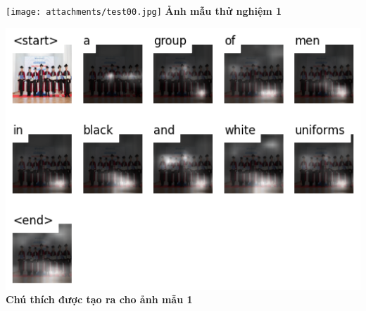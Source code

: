\documentclass[conference]{IEEEtran}
\begin{document}
\begin{center}
    \begin{minipage}[b]{0.48\textwidth}
        \centering
        \texttt{[image: attachments/test00.jpg]}
        \vspace{0.2cm}
        \textbf{Ảnh mẫu thử nghiệm 1}
    \end{minipage}
    \hfill
    \begin{minipage}[b]{0.48\textwidth}
        \centering
        \includegraphics[width=\linewidth]{attachments/test00_caption.jpg}
        \vspace{0.2cm}
        \textbf{Chú thích được tạo ra cho ảnh mẫu 1}
    \end{minipage}
\end{center}

\vspace{1cm}
\end{document}
